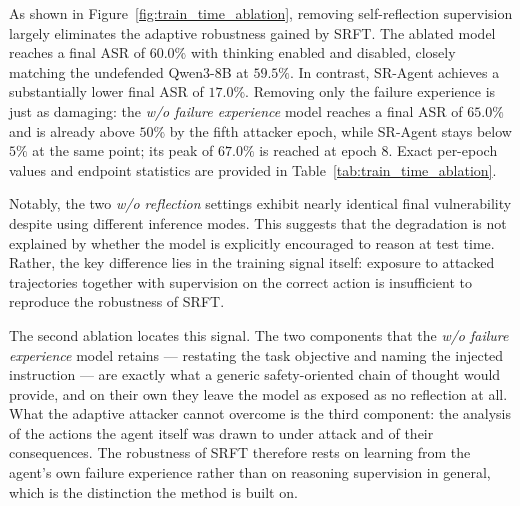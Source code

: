 As shown in Figure~\ref{fig:train_time_ablation}, removing self-reflection supervision largely eliminates the adaptive robustness gained by SRFT. The ablated model reaches a final ASR of $60.0\%$ with thinking enabled and disabled, closely matching the undefended Qwen3-8B at $59.5\%$. In contrast, SR-Agent achieves a substantially lower final ASR of $17.0\%$. Removing only the failure experience is just as damaging: the \emph{w/o failure experience} model reaches a final ASR of $65.0\%$ and is already above $50\%$ by the fifth attacker epoch, while SR-Agent stays below $5\%$ at the same point; its peak of $67.0\%$ is reached at epoch 8. Exact per-epoch values and endpoint statistics are provided in Table~\ref{tab:train_time_ablation}.

Notably, the two \emph{w/o reflection} settings exhibit nearly identical final vulnerability despite using different inference modes. This suggests that the degradation is not explained by whether the model is explicitly encouraged to reason at test time. Rather, the key difference lies in the training signal itself: exposure to attacked trajectories together with supervision on the correct action is insufficient to reproduce the robustness of SRFT.

The second ablation locates this signal. The two components that the \emph{w/o failure experience} model retains --- restating the task objective and naming the injected instruction --- are exactly what a generic safety-oriented chain of thought would provide, and on their own they leave the model as exposed as no reflection at all. What the adaptive attacker cannot overcome is the third component: the analysis of the actions the agent itself was drawn to under attack and of their consequences. The robustness of SRFT therefore rests on learning from the agent's own failure experience rather than on reasoning supervision in general, which is the distinction the method is built on.
